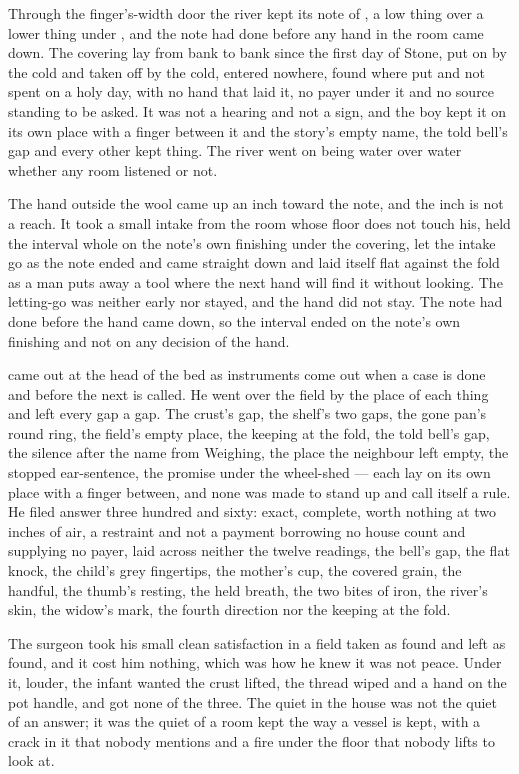 \scenebreak

Through the finger's-width door the river kept its note of , a low thing over a lower thing under , and the note had done before any hand in the room came down. The covering lay from bank to bank since the first day of Stone, put on by the cold and taken off by the cold, entered nowhere, found where put and not spent on a holy day, with no hand that laid it, no payer under it and no source standing to be asked. It was not a hearing and not a sign, and the boy kept it on its own place with a finger between it and the story's empty name, the told bell's gap and every other kept thing. The river went on being water over water whether any room listened or not.

The hand outside the wool came up an inch toward the note, and the inch is not a reach. It took a small intake from the room whose floor does not touch his, held the interval whole on the note's own finishing under the covering, let the intake go as the note ended and came straight down and laid itself flat against the fold as a man puts away a tool where the next hand will find it without looking. The letting-go was neither early nor stayed, and the hand did not stay. The note had done before the hand came down, so the interval ended on the note's own finishing and not on any decision of the hand.

 came out at the head of the bed as instruments come out when a case is done and before the next is called. He went over the field by the place of each thing and left every gap a gap. The crust's gap, the shelf's two gaps, the gone pan's round ring, the field's empty place, the keeping at the fold, the told bell's gap, the silence after the name from Weighing, the place the neighbour left empty, the stopped ear-sentence, the promise under the wheel-shed --- each lay on its own place with a finger between, and none was made to stand up and call itself a rule. He filed answer three hundred and sixty: exact, complete, worth nothing at two inches of air, a restraint and not a payment borrowing no house count and supplying no payer, laid across neither the twelve readings, the bell's gap, the flat knock, the child's grey fingertips, the mother's cup, the covered grain, the handful, the thumb's resting, the held breath, the two bites of iron, the river's skin, the widow's mark, the fourth direction nor the keeping at the fold.

The surgeon took his small clean satisfaction in a field taken as found and left as found, and it cost him nothing, which was how he knew it was not peace. Under it, louder, the infant wanted the crust lifted, the thread wiped and a hand on the pot handle, and got none of the three. The quiet in the house was not the quiet of an answer; it was the quiet of a room kept the way a vessel is kept, with a crack in it that nobody mentions and a fire under the floor that nobody lifts to look at.

